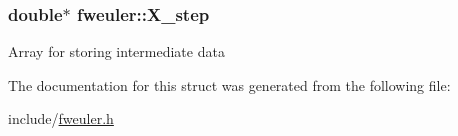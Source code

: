 \subsubsection[{X\+\_\+step}]{\setlength{\rightskip}{0pt plus 5cm}double$\ast$ fweuler\+::\+X\+\_\+step}\label{structfweuler_aceb1a0fdb7cb920512268ff3031b70dd}
Array for storing intermediate data 

The documentation for this struct was generated from the following file\+:\begin{DoxyCompactItemize}
\item 
include/\hyperlink{fweuler_8h}{fweuler.\+h}\end{DoxyCompactItemize}
